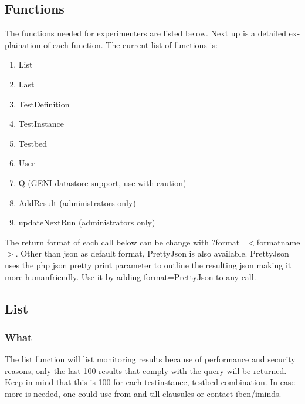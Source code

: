 \begin{otherlanguage}{english}
\section{Functions}
The functions needed for experimenters are listed below. Next up is a detailed explaination of each function. The current list of functions is:
\begin{enumerate}
\item List
\item Last
\item TestDefinition
\item TestInstance
\item Testbed
\item User
\item Q (GENI datastore support, use with caution)
\item AddResult (administrators only)
\item updateNextRun (administrators only)
\end{enumerate}
\npar
The return format of each call below can be change with ?format=$<$formatname$>$. 
Other than json as default format, PrettyJson is also available. PrettyJson uses the php json pretty print parameter to outline the resulting json making it more humanfriendly.
Use it by adding format=PrettyJson to any call.

\subsection{List}
\subsubsection{What}
The list function will list monitoring results because of performance and security reasons, only the last 100 results that comply with the query will be returned. Keep in mind that this is 100 for each testinstance, testbed combination. In case more is needed, one could use from and till clausules or contact ibcn/iminds.

\clearpage


\end{otherlanguage}
